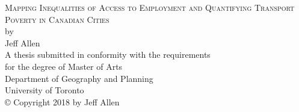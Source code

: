 \documentclass[11 pt, letterpaper]{article}
\begin{document}
	
{\begin{titlepage}
		\large
		\singlespacing
		\begin{center}
			\mbox{}
			\vfill
			\textsc{Mapping Inequalities of Access to Employment and Quantifying Transport Poverty in Canadian Cities}\\
			\vfill
			by \\
			\vfill
			{Jeff Allen}\\
			\vfill
			\vfill
			A thesis submitted in conformity with the requirements \\
			for the degree of Master of Arts  \\
			Department of Geography and Planning \\
			University of Toronto \\
			\vfill
			{\copyright} Copyright 2018 by Jeff Allen\\
			\vspace{.01\textheight}
			\mbox{}
		\end{center}
		\setcounter{page}{1}
	\end{titlepage}
	\setcounter{page}{2}}






\renewcommand{\thepage}{\roman{page}}%

\newpage
\end{document}
